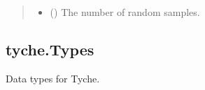 \documentclass[letterpaper,10pt,english]{sphinxmanual}
\begin{document}
\begin{fulllineitems}
\begin{fulllineitems}
\begin{quote}
\begin{description}
\begin{itemize}
\item {} 
 () \textendash{} The number of random samples.

\end{itemize}

\end{description}\end{quote}

\end{fulllineitems}


\end{fulllineitems}



\subsection{tyche.Types}
\label{\detokenize{tyche:module-tyche.Types}}\label{\detokenize{tyche:tyche-types}}
Data types for Tyche.
\end{document}
